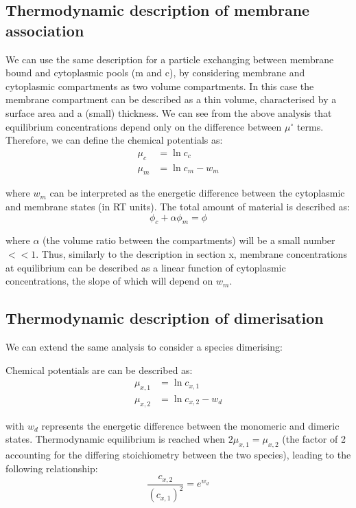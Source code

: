 \documentclass[12pt]{"report"}
\begin{document}
\subsection{Thermodynamic description of membrane association}

We can use the same description for a particle exchanging between membrane bound and cytoplasmic pools (m and c), by considering membrane and cytoplasmic compartments as two volume compartments. In this case the membrane compartment can be described as a thin volume, characterised by a surface area and a (small) thickness. We can see from the above analysis that equilibrium concentrations depend only on the difference between $\mu^{\circ}$ terms. Therefore, we can define the chemical potentials as:
\begin{align}
\mu_c &= \ln c_c\\
\mu_m &= \ln c_m - w_m
\end{align} 

where $w_m$ can be interpreted as the energetic difference between the cytoplasmic and membrane states (in RT units). The total amount of material is described as:
\begin{equation}
\phi_c + \alpha\phi_m = \phi
\end{equation}

where $\alpha$ (the volume ratio between the compartments) will be a small number $<<1$. Thus, similarly to the description in section x, membrane concentrations at equilibrium can be described as a linear function of cytoplasmic concentrations, the slope of which will depend on $w_m$.\\

\subsection{Thermodynamic description of dimerisation}

We can extend the same analysis to consider a species dimerising:

\begin{center}
\end{center}

Chemical potentials are can be described as:
\begin{align}
\mu_{x,1} &= \ln c_{x,1}\\
\mu_{x,2} &= \ln c_{x,2} - w_d
\end{align} 

with $w_d$ represents the energetic difference between the monomeric and dimeric states. Thermodynamic equilibrium is reached when $2\mu_{x,1} = \mu_{x,2}$ (the factor of 2 accounting for the differing stoichiometry between the two species), leading to the following relationship:
\begin{equation}
\frac{c_{x,2}}{(c_{x,1})^2} = e^{w_d}
\end{equation}
\end{document}
